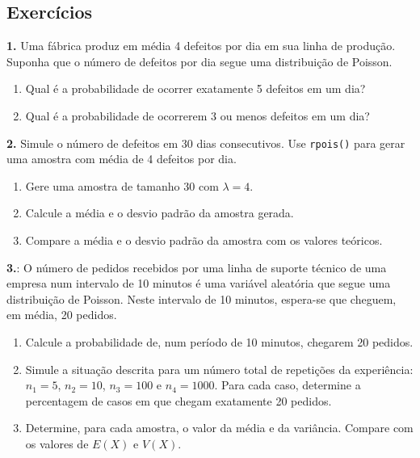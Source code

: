 \documentclass[
]{book}
\providecommand{\tightlist}{%
  \setlength{\itemsep}{0pt}\setlength{\parskip}{0pt}}
\begin{document}
\subsection{Exercícios}\label{exercuxedcios-27}

\textbf{1.} Uma fábrica produz em média 4 defeitos por dia em sua linha de produção. Suponha que o número de defeitos por dia segue uma distribuição de Poisson.

\begin{enumerate}
\def\labelenumi{(\alph{enumi})}
\tightlist
\item
  Qual é a probabilidade de ocorrer exatamente 5 defeitos em um dia?
\item
  Qual é a probabilidade de ocorrerem 3 ou menos defeitos em um dia?
\end{enumerate}

\textbf{2.} Simule o número de defeitos em 30 dias consecutivos. Use \texttt{rpois()} para gerar uma amostra com média de 4 defeitos por dia.

\begin{enumerate}
\def\labelenumi{(\alph{enumi})}
\tightlist
\item
  Gere uma amostra de tamanho 30 com \(\lambda = 4\).
\item
  Calcule a média e o desvio padrão da amostra gerada.
\item
  Compare a média e o desvio padrão da amostra com os valores teóricos.
\end{enumerate}

\textbf{3.}: O número de pedidos recebidos por uma linha de suporte
técnico de uma empresa num intervalo de 10 minutos é uma variável
aleatória que segue uma distribuição de Poisson. Neste intervalo de 10
minutos, espera-se que cheguem, em média, 20 pedidos.

\begin{enumerate}
\def\labelenumi{(\alph{enumi})}
\item
  Calcule a probabilidade de, num período de 10 minutos, chegarem 20
  pedidos.
\item
  Simule a situação descrita para um número total de repetições da
  experiência: \(n_1=5\), \(n_2=10\), \(n_3=100\) e \(n_4=1000\). Para cada
  caso, determine a percentagem de casos em que chegam exatamente 20
  pedidos.
\item
  Determine, para cada amostra, o valor da média e da variância.
  Compare com os valores de \(E(X)\) e \(V(X)\).
\end{enumerate}
\end{document}
